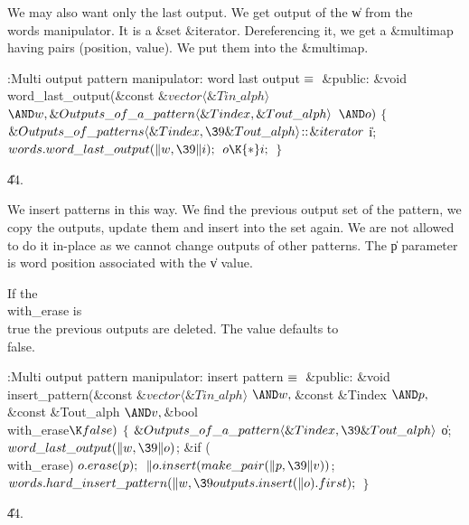 We may also want only the last output. We get output of the \|w from
the \\{words} manipulator. It is a \&{set} \&{iterator}. Dereferencing it, we
get a \&{multimap} having pairs (position, value). We put them into the
\&{multimap}.

\Y\B\4:Multi output pattern manipulator: word last output\X${}\equiv{}$\6
\4\&{public}:\6
\&{void} \\{word\_last\_output}(\&{const} ${}\&{vector}\langle\&{Tin\_alph}%
\rangle{}$ ${}{\AND}\|w,\39\&{Outputs\_of\_a\_pattern}\langle\&{Tindex},\39%
\&{Tout\_alph}\rangle{}$ ${}{\AND}\|o){}$\1\1\2\2\6
${}\{{}$\1\6
${}\&{Outputs\_of\_patterns}\langle\&{Tindex},\39\&{Tout\_alph}\rangle\DC%
\&{iterator}{}$ \|i;\7
${}\\{words}.\\{word\_last\_output}(\|w,\39\|i);{}$\6
${}\|o\K{*}\|i;{}$\6
\4${}\}{}$\2\par
\U44.\fi

We insert patterns in this way. We find the previous output set of the
pattern, we copy the outputs, update them and insert into the set again.
We are not allowed to do it in-place as we cannot change outputs of
other patterns. The \|p parameter is word position associated with the
\|v value.

If the \\{with\_erase} is \\{true} the previous outputs are deleted. The value
defaults to \\{false}.

\Y\B\4:Multi output pattern manipulator: insert pattern\X${}\equiv{}$\6
\4\&{public}:\6
\&{void} \\{insert\_pattern}(\&{const} ${}\&{vector}\langle\&{Tin\_alph}%
\rangle{}$ ${}{\AND}\|w,\39{}$\&{const} \&{Tindex} ${}{\AND}\|p,\39{}$\&{const}
\&{Tout\_alph} ${}{\AND}\|v,\39{}$\&{bool} \\{with\_erase}${}\K\\{false}){}$\1%
\1\2\2\6
${}\{{}$\1\6
${}\&{Outputs\_of\_a\_pattern}\langle\&{Tindex},\39\&{Tout\_alph}\rangle{}$ %
\|o;\7
${}\\{word\_last\_output}(\|w,\39\|o){}$;\6
\&{if} (\\{with\_erase})\1\5
${}\|o.\\{erase}(\|p);{}$\2\6
${}\|o.\\{insert}(\\{make\_pair}(\|p,\39\|v)){}$;\6
${}\\{words}.\\{hard\_insert\_pattern}(\|w,\39\\{outputs}.\\{insert}(\|o).%
\\{first});{}$\6
\4${}\}{}$\2\par
\U44.\fi

